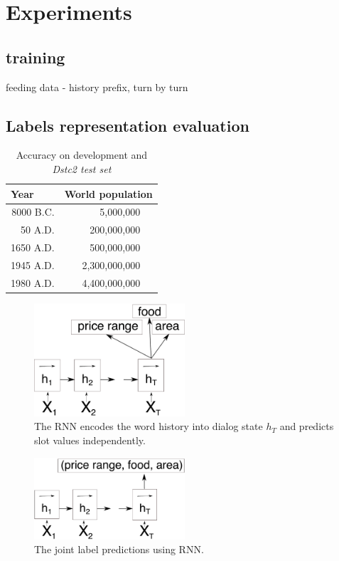 \documentclass{itatnew}
\begin{document}
\section{Experiments}

\subsection{training}
feeding data - history prefix, turn by turn

\subsection{Labels representation evaluation}

\begin{table}
\caption{Accuracy on development and {\it Dstc2 test set }}
\begin{center}
\begin{tabular}{r@{\quad}rl}
\hline
\multicolumn{1}{l}{\rule{0pt}{12pt}
                   Year}&\multicolumn{2}{l}{World population}\\[2pt]
\hline\rule{0pt}{12pt}
8000 B.C.  &     5,000,000& \\
  50 A.D.  &   200,000,000& \\
1650 A.D.  &   500,000,000& \\
1945 A.D.  & 2,300,000,000& \\
1980 A.D.  & 4,400,000,000& \\[2pt]
\hline
\end{tabular}
\end{center}
\end{table}


\begin{figure}
\includegraphics[width=0.5\textwidth]{encoder}
\caption{The RNN encodes the word history into dialog state $h_T$ and predicts slot values independently.}
\end{figure}

\begin{figure}
\includegraphics[width=0.5\textwidth]{encoder_joint}
\caption{The joint label predictions using RNN.}
\end{figure}
\end{document}
